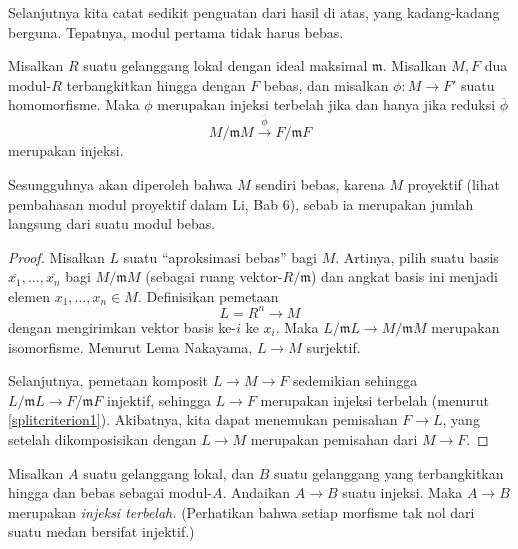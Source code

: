 Selanjutnya kita catat sedikit penguatan dari hasil di atas, yang kadang-kadang
berguna. Tepatnya, modul pertama tidak harus bebas.
\begin{proposition} 
Misalkan $R$ suatu gelanggang lokal dengan ideal maksimal $\mathfrak{m}$. Misalkan $M, F$ dua
modul-$R$ terbangkitkan hingga dengan $F$ bebas, dan misalkan $\phi: M \to F'$ suatu homomorfisme. 
Maka $\phi$ merupakan injeksi terbelah jika dan hanya jika reduksi $\overline{\phi}$
\[ M/\mathfrak{m}M \stackrel{\overline{\phi}}{\to} F/\mathfrak{m}F  \]
merupakan injeksi. 
\end{proposition}
Sesungguhnya akan diperoleh bahwa $M$ sendiri bebas, karena $M$ proyektif (lihat
pembahasan modul proyektif dalam Li, Bab 6), sebab ia merupakan jumlah langsung dari suatu modul bebas.
\begin{proof} 
Misalkan $L$ suatu ``aproksimasi bebas'' bagi $M$.
Artinya, pilih suatu basis $\overline{x_1}, \dots, \overline{x_n}$ bagi $M/\mathfrak{m}M$ (sebagai ruang
vektor-$R/\mathfrak{m}$) dan angkat basis ini menjadi elemen $x_1, \dots, x_n \in M$. Definisikan pemetaan
\[ L = R^n \to M  \]
dengan mengirimkan vektor basis ke-$i$ ke $x_i$.
Maka $L/\mathfrak{m} L \to M/\mathfrak{m}M$ merupakan isomorfisme.
Menurut Lema Nakayama,
$L \to M$ surjektif.

Selanjutnya, pemetaan komposit
$L \to M \to F$ sedemikian sehingga $L/\mathfrak{m}L \to F/\mathfrak{m}F$ injektif, sehingga
$L \to F$ merupakan injeksi terbelah (menurut \cref{splitcriterion1}).
Akibatnya, kita dapat menemukan pemisahan $F \to L$, yang setelah dikomposisikan dengan $L
\to M$ merupakan pemisahan dari $M \to F$.
\end{proof} 

\begin{exercise} 
Misalkan $A$ suatu gelanggang lokal, dan $B$ suatu gelanggang yang terbangkitkan hingga dan bebas sebagai
modul-$A$. Andaikan $A \to B$ suatu injeksi. Maka $A \to B$ merupakan \emph{injeksi
terbelah.} (Perhatikan bahwa setiap morfisme tak nol dari suatu medan
bersifat injektif.) 
\end{exercise} 
 
